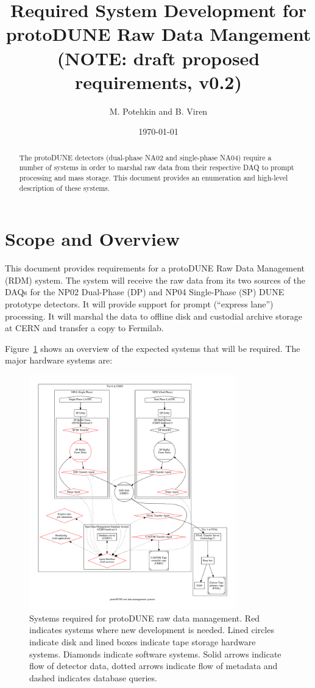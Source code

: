 \documentclass[pdftex,12pt,letter]{article}
\title{Required System Development for protoDUNE Raw Data Mangement\\
(NOTE: draft proposed requirements, v0.2)}
\date{\today}
\author{M. Potehkin and B. Viren}
\begin{document}
\maketitle

\begin{abstract}
  The protoDUNE detectors (dual-phase NA02 and single-phase NA04)
  require a number of systems in order to marshal raw data from
  their respective DAQ to prompt processing and mass storage.  This
  document provides an enumeration and high-level description of these
  systems.
\end{abstract}

\tableofcontents

\pagebreak

\section{Scope and Overview}

This document provides requirements for a protoDUNE Raw Data
Management (RDM) system.  The system will receive the raw data from
its two sources of the DAQs for the NP02 Dual-Phase (DP) and NP04
Single-Phase (SP) DUNE prototype detectors.  It will provide support
for prompt (``express lane'') processing.  It will marshal the data to
offline disk and custodial archive storage at CERN and transfer a copy
to Fermilab.  

Figure~\ref{fig:flow} shows an overview of the expected systems that
will be required.  The major hardware systems are:

\begin{figure}[h]
  \centering
  \includegraphics[width=0.8\textwidth]{flow.pdf}
  \caption{Systems required for protoDUNE raw data management.  Red indicates systems where new development is needed.  Lined circles indicate disk and lined boxes indicate tape storage hardware systems.  Diamonds indicate software systems.  Solid arrows indicate flow of detector data, dotted arrows indicate flow of metadata and dashed indicates database queries.}
  \label{fig:flow}
\end{figure}
\end{document}
